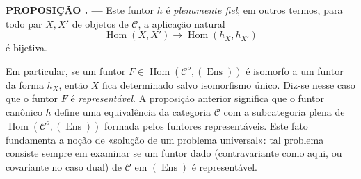 \documentclass[11pt,twoside,openany]{book}
\numberwithin{equation}{section}
\theoremstyle{plain}
\theoremstyle{definition}
\theoremstyle{remark}
\newcommand{\result}[2]{%
  \par\medskip\noindent\textbf{#1%
  \if\relax\detokenize{#2}\relax\else\space#2\fi. ---}\enspace
}
\begin{document}
\result{PROPOSIÇÃO}{1.1} Este funtor $h$ é \emph{plenamente fiel}; em outros
termos, para todo par $X,X'$ de objetos de $\mathcal C$, a aplicação
natural
\[
  \operatorname{Hom}(X,X')\longrightarrow
  \operatorname{Hom}(h_X,h_{X'})
\]
é bijetiva.

Em particular, se um funtor
$F\in\operatorname{Hom}(\mathcal C^o,(\operatorname{Ens}))$ é isomorfo a um
funtor da forma $h_X$, então $X$ fica determinado salvo isomorfismo
único. Diz-se nesse caso que o funtor $F$ é \emph{representável}. A
proposição anterior significa que o funtor canônico $h$ define uma
equivalência da categoria $\mathcal C$ com a subcategoria plena de
$\operatorname{Hom}(\mathcal C^o,(\operatorname{Ens}))$ formada pelos
funtores representáveis. Este fato fundamenta a noção de «solução de um
problema universal»: tal problema consiste sempre em examinar se um funtor
dado (contravariante como aqui, ou covariante no caso dual) de $\mathcal C$
em $(\operatorname{Ens})$ é representável.
\end{document}

